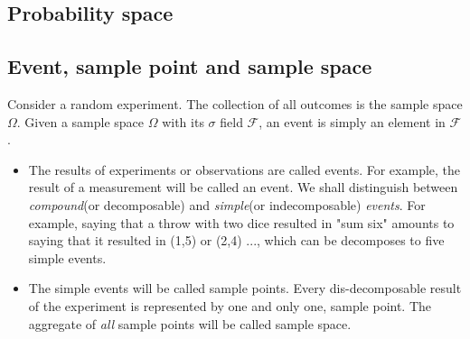 \begin{refsection}
\section{Probability space}

\subsection{Event, sample point and sample space}
\begin{definition}
	Consider a random experiment. The collection of all outcomes is the sample space $\Omega$. 
	Given a sample space $\Omega$ with its $\sigma$ field $\mathcal{F}$, an event is simply an element in  $\mathcal{F}$.	
\end{definition}

\begin{remark}[interpretation]\hfill
	\begin{itemize}
		\item The results of experiments or observations are called events. For example, the result of a measurement will be called an event. We shall distinguish between \emph{compound}(or decomposable) and \emph{simple}(or indecomposable) \emph{events}. For example, saying that a throw with two dice resulted in "sum six" amounts to saying that it resulted in (1,5) or (2,4) ..., which can be decomposes to five simple events. 
		\item The simple events will be called sample points. Every dis-decomposable result of the experiment is represented by one and only one, sample point. The aggregate of \emph{all} sample points will be called sample space. 
	\end{itemize}	
\end{remark}





\end{refsection}
